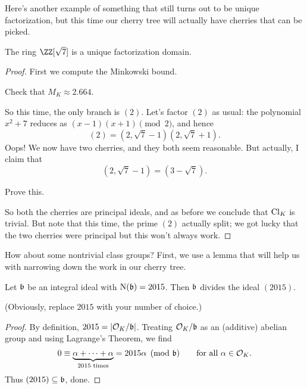 Here's another example of something that still turns out to be unique factorization,
but this time our cherry tree will actually have cherries that can be picked.
\begin{proposition}
	The ring $\ZZ[\sqrt 7]$ is a unique factorization domain.
\end{proposition}
\begin{proof}
	First we compute the Minkowski bound.
	\begin{ques}
		Check that $M_K \approx 2.664$.
	\end{ques}
	So this time, the only branch is $(2)$. Let's factor $(2)$ as usual: the polynomial $x^2+7$
	reduces as $(x-1)(x+1) \pmod 2$, and hence
	\[ (2) = \left( 2, \sqrt7-1 \right) \left( 2, \sqrt7+1 \right). \]
	Oops! We now have two cherries, and they both seem reasonable.
	But actually, I claim that
	\[ \left( 2, \sqrt7-1 \right) = \left( 3 - \sqrt 7 \right). \]
	\begin{ques}
		Prove this.
	\end{ques}
	So both the cherries are principal ideals, and as before we conclude that $\mathrm{Cl}_K$ is trivial.
	But note that this time, the prime $(2)$ actually split; we got lucky
	that the two cherries were principal but this won't always work.
\end{proof}

How about some nontrivial class groups?
First, we use a lemma that will help us with
narrowing down the work in our cherry tree.
\begin{lemma}
	Let $\mathfrak b$ be an integral ideal with $\operatorname{N}(\mathfrak b) = 2015$.
	Then $\mathfrak b$ divides the ideal $(2015)$.
\end{lemma}
(Obviously, replace $2015$ with your number of choice.)
\begin{proof}
	By definition, $2015 = \left\lvert \mathcal O_K / \mathfrak b \right\rvert$.
	Treating $\mathcal O_K/\mathfrak b$ as an (additive) abelian group and using Lagrange's Theorem, we find
	\[ 0 \equiv
		\underbrace{\alpha + \dots + \alpha}_{2015\text{ times}} = 2015\alpha
		\pmod {\mathfrak b} \qquad\text{for all } \alpha \in \mathcal O_K. \]
	Thus $(2015) \subseteq \mathfrak b$, done.
\end{proof}

